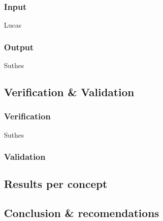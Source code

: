 \subsubsection{Input}
Lucas
\subsubsection{Output}
Suthes


\subsection{Verification \& Validation}

\subsubsection{Verification}
Suthes
\subsubsection{Validation}



\subsection{Results per concept}



\subsection{Conclusion \& recomendations}
